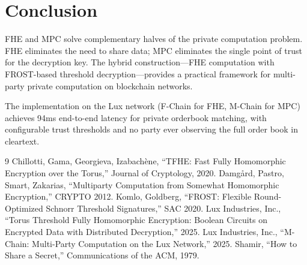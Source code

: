\section{Conclusion}


FHE and MPC solve complementary halves of the private computation problem. FHE eliminates the need to share data; MPC eliminates the single point of trust for the decryption key. The hybrid construction---FHE computation with FROST-based threshold decryption---provides a practical framework for multi-party private computation on blockchain networks.

The implementation on the Lux network (F-Chain for FHE, M-Chain for MPC) achieves 94ms end-to-end latency for private orderbook matching, with configurable trust thresholds and no party ever observing the full order book in cleartext.

\begin{thebibliography}{9}
 Chillotti, Gama, Georgieva, Izabach\`{e}ne, ``TFHE: Fast Fully Homomorphic Encryption over the Torus,'' Journal of Cryptology, 2020.
 Damg\r{a}rd, Pastro, Smart, Zakarias, ``Multiparty Computation from Somewhat Homomorphic Encryption,'' CRYPTO 2012.
 Komlo, Goldberg, ``FROST: Flexible Round-Optimized Schnorr Threshold Signatures,'' SAC 2020.
 Lux Industries, Inc., ``Torus Threshold Fully Homomorphic Encryption: Boolean Circuits on Encrypted Data with Distributed Decryption,'' 2025.
 Lux Industries, Inc., ``M-Chain: Multi-Party Computation on the Lux Network,'' 2025.
 Shamir, ``How to Share a Secret,'' Communications of the ACM, 1979.
\end{thebibliography}

